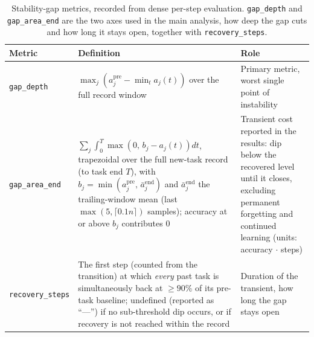 \begin{table}[H]
    \centering
    \small
    \begin{tabular}{@{}p{2.5cm} p{7.7cm} p{4.4cm}@{}}
        \hline
        Metric                   & Definition                                                                                                                                                                                                                                                                                                                                        & Role                                                                                                                                                                         \\
        \hline
        \texttt{gap\_depth}      & $\max_j \left( a_j^{\text{pre}} - \min_t a_j(t) \right)$ over the full record window                                                                                                                                                                                                                                                              & Primary metric, worst single point of instability                                                                                                                            \\
        \texttt{gap\_area\_end}  & $\sum_j \int_0^{T} \max\!\left(0,\, b_j - a_j(t)\right) dt$, trapezoidal over the full new-task record (to task end $T$), with $b_j = \min\!\left(a_j^{\text{pre}},\, \bar a_j^{\text{end}}\right)$ and $\bar a_j^{\text{end}}$ the trailing-window mean (last $\max(5, \lceil 0.1 n\rceil)$ samples); accuracy at or above $b_j$ contributes $0$ & Transient cost reported in the results: dip below the recovered level until it closes, excluding permanent forgetting and continued learning (units: accuracy $\cdot$ steps) \\
        \texttt{recovery\_steps} & The first step (counted from the transition) at which \emph{every} past task is simultaneously back at $\geq 90\%$ of its pre-task baseline; undefined (reported as ``---'') if no sub-threshold dip occurs, or if recovery is not reached within the record                                                                                       & Duration of the transient, how long the gap stays open                                                                                                                       \\
        \hline
    \end{tabular}
    \caption{Stability-gap metrics, recorded from dense per-step evaluation. \texttt{gap\_depth} and \texttt{gap\_area\_end} are the two axes used in the main analysis, how deep the gap cuts and how long it stays open, together with \texttt{recovery\_steps}.}
    \label{tab:gap_metrics}
\end{table}

